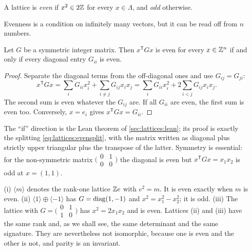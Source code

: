 \begin{definition}\label{def:lattices:even}
A lattice is \emph{even} if $x^2\in2\mathbb{Z}$ for every $x\in\Lambda$, and
\emph{odd} otherwise. 
\end{definition}

Evenness is a condition on infinitely many vectors, but it can be read off from $n$ numbers.

\begin{lemma}\label{lem:lattices:evendiag}
Let $G$ be a symmetric integer matrix. Then $x^{\mathsf T}Gx$ is even for every $x\in\mathbb{Z}^n$ if
and only if every diagonal entry $G_{ii}$ is even.
\end{lemma}
\begin{proof}
Separate the diagonal terms from the off-diagonal ones and use $G_{ij}=G_{ji}$:
\begin{equation}\label{eq:lattices:evensplit}
 x^{\mathsf T}Gx=\sum_iG_{ii}x_i^2+\sum_{i\neq j}G_{ij}x_ix_j
 =\sum_iG_{ii}x_i^2+2\sum_{i<j}G_{ij}x_ix_j .
\end{equation}
The second sum is even whatever the $G_{ij}$ are. If all $G_{ii}$ are even, the first sum is
even too. Conversely, $x=e_i$ gives $x^{\mathsf T}Gx=G_{ii}$.
\end{proof}

The ``if'' direction is the Lean theorem  of
\cref{sec:lattices:lean}; its proof is exactly the splitting \eqref{eq:lattices:evensplit},
with the matrix written as diagonal plus strictly upper triangular plus the transpose of the
latter. Symmetry is essential: for the non-symmetric matrix
$\bigl(\begin{smallmatrix}0&1\\0&0\end{smallmatrix}\bigr)$ the diagonal is even but
$x^{\mathsf T}Gx=x_1x_2$ is odd at $x=(1,1)$.

\begin{example}\label{ex:lattices:small}
(i) $\langle m\rangle$ denotes the rank-one lattice $\mathbb{Z} e$ with $e^2=m$. It is even exactly
when $m$ is even. (ii) $\langle1\rangle\oplus\langle-1\rangle$ has
$G=\operatorname{diag}(1,-1)$ and $x^2=x_1^2-x_2^2$; it is odd. (iii) The lattice with
$G=\bigl(\begin{smallmatrix}0&1\\1&0\end{smallmatrix}\bigr)$ has $x^2=2x_1x_2$ and is even.
Lattices (ii) and (iii) have the same rank and, as we shall see, the same determinant and the
same signature. They are nevertheless not isomorphic, because one is even and the other is
not, and parity is an invariant.
\end{example}

